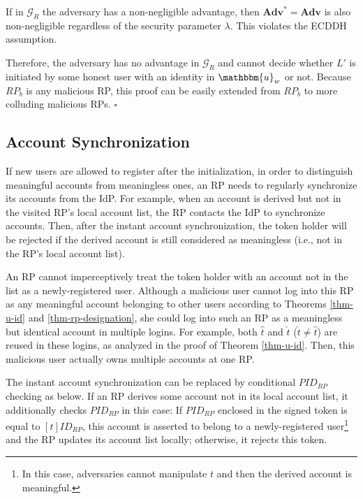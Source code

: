 If in $\mathcal{G}_R$ the adversary has a non-negligible advantage, then $\mathbf{Adv}^*={\mathbf{Adv}}$ is also non-negligible regardless of the security parameter $\lambda$. This violates the ECDDH assumption.

Therefore, the adversary has no advantage in $\mathcal{G}_R$ and cannot decide whether $L'$ is initiated by some honest user with an identity in $\mathbbm{u}_w$ or not.
Because $RP_b$ is any malicious RP, this proof can be easily extended from $RP_b$ to more colluding malicious RPs.
\hfill $\square$


\subsection{Account Synchronization}
\label{account-syn}
If new users are allowed to register after the initialization,
in order to distinguish meaningful accounts from meaningless ones,
 an RP needs to regularly synchronize its accounts from the IdP.
For example,
    when an account is derived but not in the visited RP's local account list,
        the RP contacts the IdP to synchronize accounts.
Then, after the instant account synchronization, 
    the token holder will be rejected
     if the derived account is still considered as meaningless (i.e., not in the RP's local account list).

An RP cannot imperceptively treat the token holder with an account not in the list
 as a newly-registered user.
Although a malicious user cannot log into this RP as any meaningful account belonging to other users according to Theorems \ref{thm-u-id} and \ref{thm-rp-designation},
 she could log into such an RP as a meaningless but identical account in multiple logins.
For example, both $\hat{t}$ and $\check{t}$ ($\check{t} \neq \hat{t}$) are reused in these logins,
    as analyzed in the proof of Theorem \ref{thm-u-id}.
Then, this malicious user actually owns multiple accounts at one RP.


The instant account synchronization can be replaced by conditional $PID_{RP}$ checking as below.
If an RP derives some account not in its local account list,
    it additionally checks $PID_{RP}$ in this case:
     If $PID_{RP}$ enclosed in the signed token is equal to $[t]ID_{RP}$,
                this account is asserted to belong to a newly-registered user\footnote{In this case, adversaries cannot manipulate $t$ and then the derived account is meaningful.}
                and the RP updates its account list locally;
    otherwise, it rejects this token.


